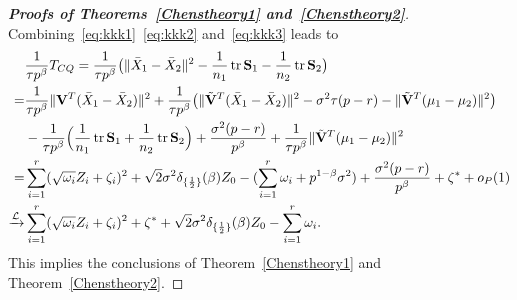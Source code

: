 \documentclass[3p]{elsarticle}
\DeclareMathOperator{\mytr}{tr}
\theoremstyle{plain}
\theoremstyle{definition}
\theoremstyle{remark}
\begin{document}
\begin{appendices}
\begin{proof}[\textbf{Proofs of Theorems~\ref{Chenstheory1} and~\ref{Chenstheory2}}]
    Combining~\eqref{eq:kkk1}~\eqref{eq:kkk2} and~\eqref{eq:kkk3} leads to
    $$
    \begin{aligned}
        &\frac{1}{\tau p^{\beta}} T_{CQ}
        =\frac{1}{\tau p^{\beta}}\big(\|\bar{X}_1-\bar{X}_2\|^2-\frac{1}{n_1}\mytr \BS_1-\frac{1}{n_2}\mytr \BS_2\big)\\
        =&
        \frac{1}{\tau p^{\beta}}{\|\BV^T(\bar{X}_1-\bar{X}_2)\|^2}+
        \frac{1}{\tau p^{\beta}} \big({\|\tilde{\BV}^T(\bar{X}_1-\bar{X}_2)\|^2-\sigma^2 \tau(p-r)-\|\tilde{\BV}^T(\mu_1-\mu_2)\|^2}\big)\\
        &-\frac{1}{\tau p^{\beta}}\Big(\frac{1}{n_1}\mytr \BS_1+\frac{1}{n_2}\mytr \BS_2\Big)+\frac{\sigma^2 (p-r)}{p^\beta}+\frac{1}{\tau p^\beta}\|\tilde{\BV}^T(\mu_1-\mu_2)\|^2\\
        =&
        \sum_{i=1}^r (\sqrt{\omega_i} Z_i+\zeta_i)^2+
   \sqrt{2} \sigma^2 \delta_{\{\frac{1}{2}\}}(\beta)Z_0
        -
        (\sum_{i=1}^r \omega_i+p^{1-\beta}\sigma^2)
        +\frac{\sigma^2 (p-r)}{p^\beta}+\zeta^*+o_P(1)\\
        \xrightarrow{\mathcal{L}}&
        \sum_{i=1}^r (\sqrt{\omega_i} Z_i+\zeta_i)^2+
\zeta^*+
    \sqrt{2}\sigma^2 \delta_{\{\frac{1}{2}\}}(\beta)Z_0
        -
        \sum_{i=1}^r \omega_i.
    \end{aligned}
    $$
    This implies the conclusions of Theorem~\ref{Chenstheory1} and Theorem~\ref{Chenstheory2}.

%

\end{proof}


\end{appendices}
\end{document}
